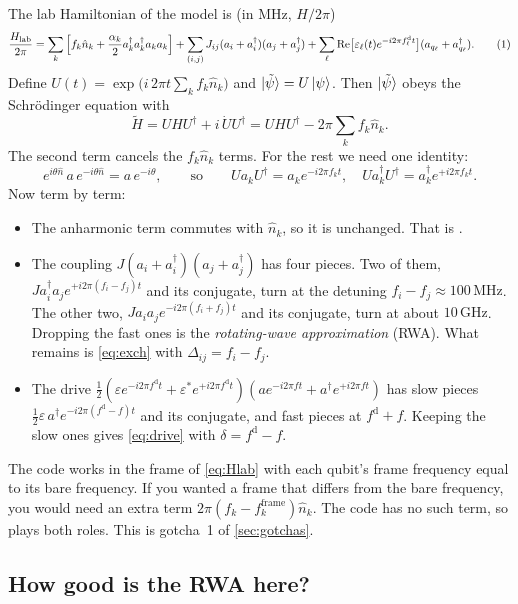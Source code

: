 \documentclass[11pt,a4paper]{article}
\DeclareRobustCommand{\code}[1]{\texttt{\detokenize{#1}}}
\newcommand{\ad}{a^{\dagger}}
\newcommand{\MHz}{\,\mathrm{MHz}}
\newcommand{\GHz}{\,\mathrm{GHz}}
\newcommand{\eqlab}[1]{\refstepcounter{equation}\tag{\theequation}\label{#1}}
\begin{document}
The lab Hamiltonian of the model is (in MHz, \(H/2\pi\))
\[
\frac{H_{\text{lab}}}{2\pi} = \sum_k\Big[f_k\hat n_k + \frac{\alpha_k}{2}\ad_k\ad_k a_k a_k\Big]
+ \sum_{(i,j)}J_{ij}(a_i+\ad_i)(a_j+\ad_j)
+ \sum_\ell \mathrm{Re}\big[\varepsilon_\ell(t)e^{-i2\pi f^{\text{d}}_\ell t}\big](a_{q_\ell}+\ad_{q_\ell}) .
\eqlab{eq:Hlab}
\]
Define \(U(t) = \exp\big(i\,2\pi t\sum_k f_k\hat n_k\big)\) and \(\ket{\tilde\psi} = U\ket{\psi}\). Then
\(\ket{\tilde\psi}\) obeys the Schr\"odinger equation with
\[
\tilde H = U H U^\dagger + i\,\dot U U^\dagger = U H U^\dagger - 2\pi\sum_k f_k\hat n_k .
\]
The second term cancels the \(f_k\hat n_k\) terms. For the rest we need one identity:
\[
e^{i\theta\hat n}\,a\,e^{-i\theta\hat n} = a\,e^{-i\theta}, \qquad\text{so}\qquad U a_k U^\dagger = a_k e^{-i2\pi f_k t},\quad U\ad_k U^\dagger = \ad_k e^{+i2\pi f_k t}.
\]
Now term by term:
\begin{itemize}
\item The anharmonic term commutes with \(\hat n_k\), so it is unchanged. That is \code{H_drift}.
\item The coupling \(J(a_i+\ad_i)(a_j+\ad_j)\) has four pieces. Two of them,
  \(J\ad_i a_j e^{+i2\pi(f_i-f_j)t}\) and its conjugate, turn at the detuning \(f_i - f_j\approx 100\MHz\). The other two,
  \(J a_i a_j e^{-i2\pi(f_i+f_j)t}\) and its conjugate, turn at about \(10\GHz\). Dropping the fast ones is the
  \emph{rotating-wave approximation} (RWA). What remains is \cref{eq:exch} with \(\Delta_{ij} = f_i - f_j\).
\item The drive \(\tfrac12(\varepsilon e^{-i2\pi f^{\text{d}}t} + \varepsilon^* e^{+i2\pi f^{\text{d}}t})(a e^{-i2\pi f t} + \ad e^{+i2\pi f t})\)
  has slow pieces \(\tfrac12\varepsilon\,\ad e^{-i2\pi(f^{\text{d}}-f)t}\) and its conjugate, and fast pieces at
  \(f^{\text{d}} + f\). Keeping the slow ones gives \cref{eq:drive} with \(\delta = f^{\text{d}} - f\).
\end{itemize}

\begin{keybox}
The code works in the frame of \cref{eq:Hlab} with each qubit's frame frequency equal to its bare frequency. If you
wanted a frame that differs from the bare frequency, you would need an extra term \(2\pi(f_k - f_k^{\text{frame}})\hat n_k\).
The code has no such term, so \code{frame_MHz} plays both roles. This is gotcha~1 of \cref{sec:gotchas}.
\end{keybox}

\subsection{How good is the RWA here?}
\end{document}
